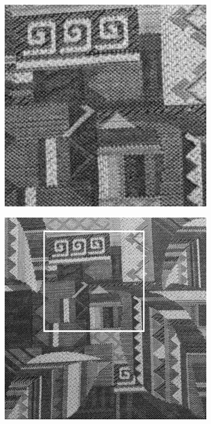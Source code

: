 \begin{figure}[!h]
\centering
\begin{subfigure}{0.39\linewidth}
  \centering
\includegraphics[width=\linewidth]{img/ch5/tex_zoom_in_stage_5.png}
\caption{}
\label{f:patternA}
\end{subfigure}
\begin{subfigure}{0.39\linewidth}
  \centering
\includegraphics[width=\linewidth]{img/ch5/tex_stage_5.png}

\end{subfigure}
\end{figure}
